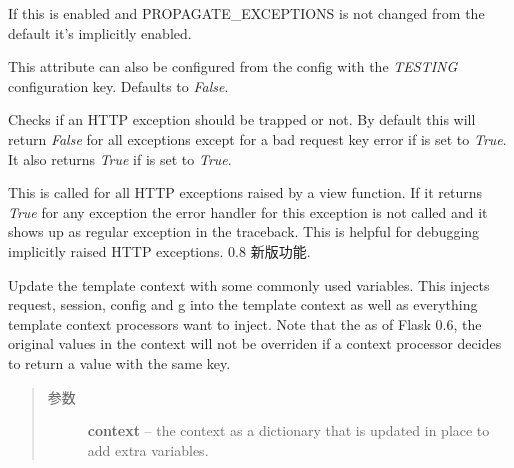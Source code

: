 \documentclass[a4paper,12pt]{sphinxmanual}
\begin{document}
\begin{fulllineitems}
\begin{fulllineitems}
If this is enabled and PROPAGATE\_EXCEPTIONS is not changed from the
default it's implicitly enabled.

This attribute can also be configured from the config with the
\emph{TESTING} configuration key.  Defaults to \emph{False}.

\end{fulllineitems}


\begin{fulllineitems}
\label{api:flask.Flask.trap_http_exception}
Checks if an HTTP exception should be trapped or not.  By default
this will return \emph{False} for all exceptions except for a bad request
key error if  is set to \emph{True}.  It
also returns \emph{True} if  is set to \emph{True}.

This is called for all HTTP exceptions raised by a view function.
If it returns \emph{True} for any exception the error handler for this
exception is not called and it shows up as regular exception in the
traceback.  This is helpful for debugging implicitly raised HTTP
exceptions.
0.8 新版功能.
\end{fulllineitems}


\begin{fulllineitems}
\label{api:flask.Flask.update_template_context}
Update the template context with some commonly used variables.
This injects request, session, config and g into the template
context as well as everything template context processors want
to inject.  Note that the as of Flask 0.6, the original values
in the context will not be overriden if a context processor
decides to return a value with the same key.
\begin{quote}\begin{description}
\item[{参数}] \leavevmode
\textbf{context} -- the context as a dictionary that is updated in place
to add extra variables.

\end{description}\end{quote}

\end{fulllineitems}


\end{fulllineitems}
\end{document}
